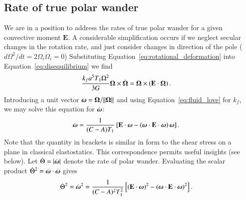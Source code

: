 \documentclass[preprint,12pt,authoryear]{elsarticle}
\newcommand{\mitbf}[1]{\hbox{\mathversion{bold}$#1$}}
\begin{document}
\subsection{Rate of true polar wander}
\label{sec:tpw_rate}

We are in a position to address the rates of true polar wander for a given convective moment $\mathbf{E}$.
A considerable simplification occurs if we neglect secular changes in the rotation rate, and just consider changes in direction of the pole ($d \Omega^2 / dt = 2 {\Omega_i} \dot{ \Omega}_i = 0$)
Substituting Equation~\eqref{eq:rotational_deformation} into Equation~\eqref{eq:disequilibrium} we find
\begin{equation}
\frac{k_f a^5 T_1 \Omega^2}{3G}\mitbf{\Omega} \times \dot{\mitbf{\Omega} } = \mitbf{\Omega} \times \left( \mathbf{E} \cdot \mitbf{\Omega} \right).
\label{eq:liouville}
\end{equation}
Introducing a unit vector $\mitbf{\omega} = \mitbf{\Omega}/\|\mitbf{\Omega} \|$ and using Equation~\eqref{eq:fluid_love} for $k_f$,  we may solve this equation for $\dot{\mitbf{\omega}}$:
\begin{equation}
 \dot{\mitbf{\omega}}  = \frac{1}{(C-A)T_1} \left[ \mathbf{E} \cdot \mitbf{\omega} - \left( \mitbf{\omega} \cdot \mathbf{E} \cdot \mitbf{\omega}  \right) \mitbf{\omega} \right].
\label{eq:liouville_ode}
\end{equation}
Note that the quantity in brackets is similar in form to the shear stress on a plane in classical elastostatics.
This correspondence permits useful insights (see below).
Let $\dot{\Theta} = \vert \dot{\mitbf{\omega}} \vert$ denote the rate of polar wander.
Evaluating the scalar product $\dot{\Theta}^2 = \dot{\mitbf{\omega}} \cdot \dot{\mitbf{\omega}}$ gives
\begin{equation}
\dot{\Theta}^2 = \dot{\mitbf{\omega}}^2 = \frac{1}{(C-A)^2 T_1^2} \left[ (\mathbf{E}\cdot\mitbf{\omega})^2 - (\mitbf{\omega}\cdot\mathbf{E}\cdot\mitbf{\omega})^2 \right].
\label{eq:polar_wander_rate_tensor}
\end{equation}
\end{document}
